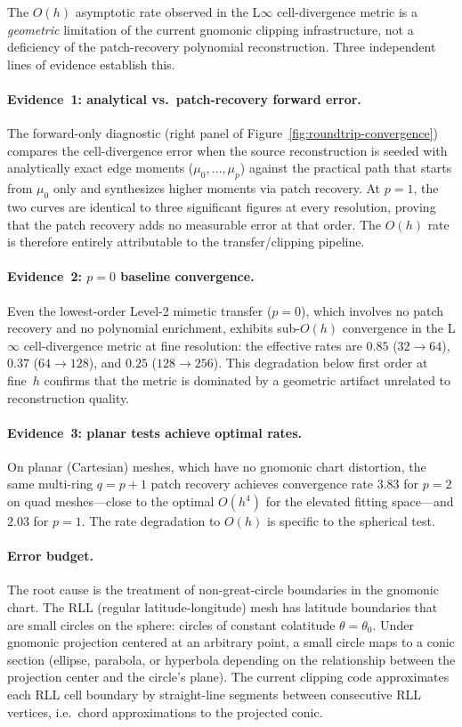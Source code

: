 \documentclass[11pt]{article}
\begin{document}
The \(O(h)\) asymptotic rate observed in the L\(\infty\) cell-divergence metric
is a \emph{geometric} limitation of the current gnomonic clipping
infrastructure, not a deficiency of the patch-recovery polynomial
reconstruction.  Three independent lines of evidence establish this.

\paragraph{Evidence~1: analytical vs.\ patch-recovery forward error.}
The forward-only diagnostic (right panel of
Figure~\ref{fig:roundtrip-convergence}) compares the cell-divergence error when
the source reconstruction is seeded with analytically exact edge moments
(\(\mu_0,\ldots,\mu_p\)) against the practical path that starts from
\(\mu_0\) only and synthesizes higher moments via patch recovery.  At \(p=1\),
the two curves are identical to three significant figures at every resolution,
proving that the patch recovery adds no measurable error at that order.  The
\(O(h)\) rate is therefore entirely attributable to the transfer/clipping
pipeline.

\paragraph{Evidence~2: \(p=0\) baseline convergence.}
Even the lowest-order Level-2 mimetic transfer (\(p=0\)), which involves no
patch recovery and no polynomial enrichment, exhibits sub-\(O(h)\) convergence
in the L\(\infty\) cell-divergence metric at fine resolution: the effective
rates are \(0.85\) (\(32\to64\)), \(0.37\) (\(64\to128\)), and \(0.25\)
(\(128\to256\)).  This degradation below first order at fine~\(h\) confirms
that the metric is dominated by a geometric artifact unrelated to
reconstruction quality.

\paragraph{Evidence~3: planar tests achieve optimal rates.}
On planar (Cartesian) meshes, which have no gnomonic chart distortion, the same
multi-ring \(q=p+1\) patch recovery achieves convergence rate \(3.83\) for
\(p=2\) on quad meshes---close to the optimal \(O(h^4)\) for the elevated
fitting space---and \(2.03\) for \(p=1\).  The rate degradation to \(O(h)\) is
specific to the spherical test.

\paragraph{Error budget.}
The root cause is the treatment of non-great-circle boundaries in the gnomonic
chart.  The RLL (regular latitude-longitude) mesh has latitude boundaries that
are small circles on the sphere: circles of constant colatitude \(\theta=
\theta_0\).  Under gnomonic projection centered at an arbitrary point, a small
circle maps to a conic section (ellipse, parabola, or hyperbola depending on
the relationship between the projection center and the circle's plane).  The
current clipping code approximates each RLL cell boundary by straight-line
segments between consecutive RLL vertices, i.e.\ chord approximations to
the projected conic.
\end{document}
